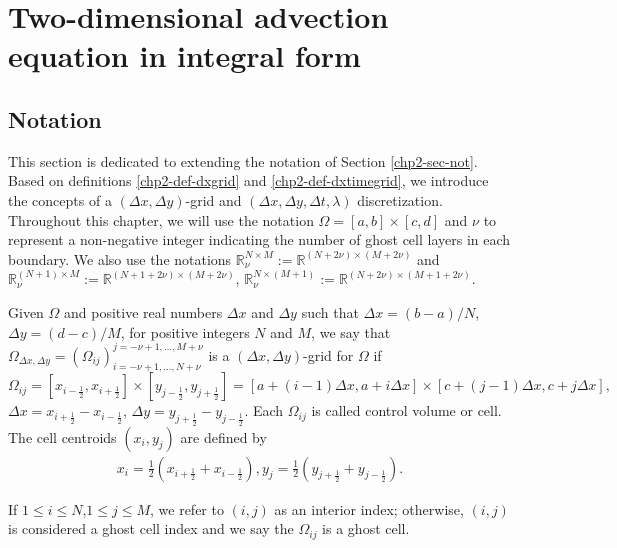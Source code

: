 \section{Two-dimensional advection equation in integral form}
\label{sec-adv2d}

\subsection{Notation}
\label{chp3-sec-not}
This section is dedicated to extending the notation of Section \ref{chp2-sec-not}.
Based on definitions \ref{chp2-def-dxgrid} and \ref{chp2-def-dxtimegrid},
we introduce the concepts of a $(\Delta x,\Delta y)$-grid and $(\Delta x, \Delta y, \Delta t, \lambda)$ discretization.
Throughout this chapter, we will use the notation $\Omega=[a,b]\times[c,d]$
and $\nu$ to represent a non-negative integer indicating the number of ghost cell layers in each boundary.
We also use the notations $\mathbb{R}^{N\times M}_{\nu}:=\mathbb{R}^{(N+2\nu)\times (M+2\nu)}$ and
$\mathbb{R}^{(N+1)\times M}_{\nu}:=\mathbb{R}^{(N+1+2\nu)\times (M+2\nu)}$,
$\mathbb{R}^{N\times (M+1)}_{\nu}:=\mathbb{R}^{(N+2\nu)\times (M+1+2\nu)}$.
\begin{definition}
	\label{chp2-def-2dgrid}
	Given $\Omega$ and positive real numbers $\Delta x$ and $\Delta y$ such that $\Delta x = (b-a)/N$, 
	$\Delta y = (d-c)/M$, for positive integers $N$ and $M$,
	we say that $\Omega_{\Delta x, \Delta y}=(\Omega_{ij})_{i=-\nu+1,\ldots,N+\nu}^{j=-\nu+1,\ldots,M+\nu}$
	is a $(\Delta x, \Delta y)$-grid for $\Omega$ if
    \begin{equation*}
	\Omega_{ij} = [x_{i-\frac{1}{2}}, x_{i+\frac{1}{2}}]\times [y_{j-\frac{1}{2}}, y_{j+\frac{1}{2}}] =
    [a+(i-1)\Delta x,a+i\Delta x]\times [c+(j-1)\Delta x,c+j\Delta x],
    \end{equation*}
	$\Delta x = x_{i+\frac{1}{2}}-x_{i-\frac{1}{2}}$, 	$\Delta y = y_{j+\frac{1}{2}}-y_{j-\frac{1}{2}}$.
	Each $\Omega_{ij}$ is called control volume or cell.
	The cell centroids $(x_i,y_j)$ are defined by
    \begin{align*}
       x_i = \frac{1}{2}(x_{i+\frac{1}{2}} + x_{i-\frac{1}{2}}), y_j = \frac{1}{2}(y_{j+\frac{1}{2}} + y_{j-\frac{1}{2}}).
    \end{align*}
\end{definition}
\begin{remark}
If $1 \leq i \leq N$,$1 \leq j \leq M$, we refer to $(i,j)$ as an interior index;
otherwise, $(i,j)$ is considered a ghost cell index and we say the $\Omega_{ij}$ is a ghost cell.
\end{remark}
